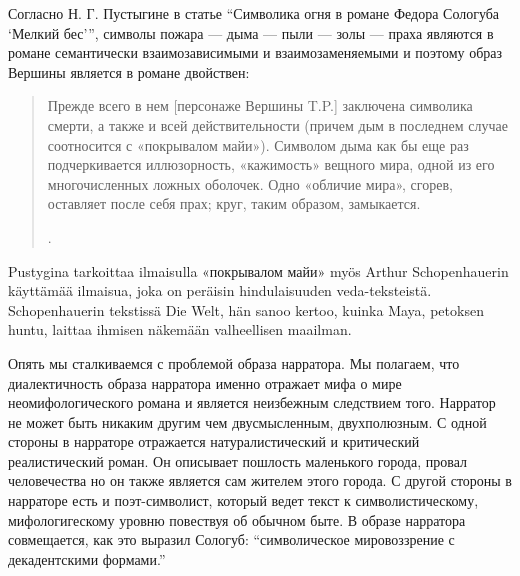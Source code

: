 \documentclass[12pt,a4paper]{article}
\begin{document}
Согласно Н. Г. Пустыгине в статье \enquote{Символика огня в романе Федора Сологуба \enquote{Мелкий бес}}, символы пожара — дыма — пыли — золы — праха являются в романе семантически взаимозависимыми и взаимозаменяемыми и поэтому образ Вершины является в романе двойствен:

\begin{quote}
Прежде всего в нем [персонаже Вершины T.P.] заключена символика смерти, а также и всей действительности (причем дым в последнем случае соотносится с «покрывалом майи»). Символом дыма как бы еще раз подчеркивается иллюзорность, «кажимость» вещного мира, одной из его многочисленных ложных оболочек. Одно «обличие мира», сгорев, оставляет после себя прах; круг, таким образом, замыкается.

\parencite{pustygina1989}.
\end{quote}

Pustygina tarkoittaa ilmaisulla «покрывалом майи» myös Arthur Schopenhauerin käyttämää ilmaisua, joka on peräisin hindulaisuuden veda-teksteistä. Schopenhauerin tekstissä Die Welt, hän sanoo kertoo, kuinka Maya, petoksen huntu, laittaa ihmisen näkemään valheellisen maailman.

Опять мы сталкиваемся с проблемой образа нарратора. Мы полагаем, что диалектичность образа нарратора именно отражает мифа о мире неомифологического романа и является неизбежным следствием того. Нарратор не может быть никаким другим чем двусмысленным, двухполюзным. С одной стороны в нарраторе отражается натуралистический и критический реалистический роман. Он описывает пошлость маленького города, провал человечества но он также является сам жителем этого города. С другой стороны в нарраторе есть и поэт-символист, который ведет текст к символистическому, мифологигескому уровню повествуя об обычном быте. В образе нарратора совмещается, как это выразил Сологуб: \enquote{символическое мировоззрение с декадентскими формами.}







\end{document}
